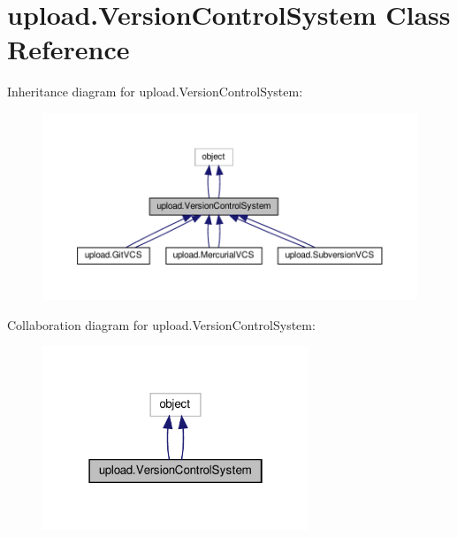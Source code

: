 \hypertarget{classupload_1_1_version_control_system}{}\section{upload.\+Version\+Control\+System Class Reference}
\label{classupload_1_1_version_control_system}


Inheritance diagram for upload.\+Version\+Control\+System\+:
\nopagebreak
\begin{figure}[H]
\begin{center}
\leavevmode
\includegraphics[width=350pt]{classupload_1_1_version_control_system__inherit__graph}
\end{center}
\end{figure}


Collaboration diagram for upload.\+Version\+Control\+System\+:
\nopagebreak
\begin{figure}[H]
\begin{center}
\leavevmode
\includegraphics[width=226pt]{classupload_1_1_version_control_system__coll__graph}
\end{center}
\end{figure}
